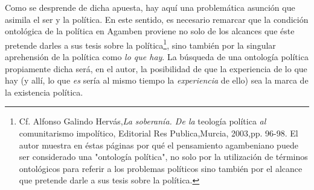 Como se desprende de dicha apuesta, hay aquí una problemática asunción
que asimila el ser y la política. En este sentido, es necesario remarcar
que la condición ontológica de la política en Agamben proviene no solo
de los alcances que éste pretende darles a sus tesis sobre la
política\footnote{Cf. Alfonso Galindo Hervás,\emph{La soberanía. De la}
  teología política \emph{al} comunitarismo impolítico, Editorial Res
  Publica,Murcia, 2003,pp. 96-98. El autor muestra en éstas páginas por
  qué el pensamiento agambeniano puede ser considerado una "ontología
  política", no solo por la utilización de términos ontológicos para
  referir a los problemas políticos sino también por el alcance que
  pretende darle a sus tesis sobre la política.}, sino también por la
singular aprehensión de la política como \emph{lo que hay}. La búsqueda
de una ontología política propiamente dicha será, en el autor, la
posibilidad de que la experiencia de lo que hay (y allí, lo que
\emph{es} sería al mismo tiempo la \emph{experiencia} de ello) sea la
marca de la existencia política.

